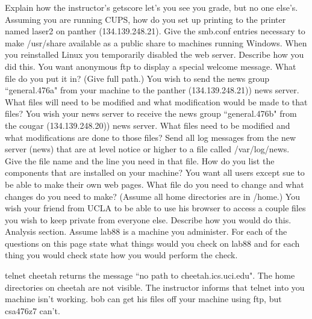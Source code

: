 Explain how the instructor's {\ltt{}getscore} let's you see you
grade, but no one else's.
\vskip 1.8in
\ques
Assuming you are running {\ltt{}CUPS}, how do you set up printing
to the printer named {\ltt{}laser2} on {\ltt{}panther}
({\ltt{}134.139.248.21}).
\vskip 1.2in
\ques
Give the {\ltt{}smb.conf} entries necessary to make
{\ltt{}/usr/share} available as a public share to
machines running Windows.
\vskip 1.5in
\vfill\eject
\ques
When you reinstalled Linux you temporarily disabled the web server.
Describe how you did this.
\vskip 0.9in
\ques
You want anonymous ftp to display a special welcome message.
What file do you put it in? (Give full path.)
\vskip 0.8in
\ques
You wish to send the news group ``general.476a" from your machine
to the {\ltt{}panther} ({\ltt{}134.139.248.21)}) news server.
What files will need to be modified
and what modification would be made to that files?
\vskip 2.6in
\ques
You wish your news server to receive the news group ``general.476b"
from the {\ltt{}cougar} ({\ltt{}134.139.248.20)}) news server.
What files need to be modified and what modifications are done to those files?
\vskip 2.2in
\vfill\eject
\ques
Send all log messages from the new server
({\ltt{}news}) that are at level {\ltt{}notice} or higher
to a file called {\ltt{}/var/log/news}.
Give the file name and the line you need in that file.
\vskip 0.8in
\ques
How do you list the components that are installed on your machine?
\vskip 1.2in
\ques
You want all users except {\ltt{}sue} to be able to make their
own web pages.
What file do you need to change and what changes do you need to make?
(Assume all home directories are in {\ltt{}/home}.)
\vskip 2.0in
\ques
You wish your friend from {\ltt{}UCLA} to be able to use his browser
to access a couple files you wish to keep private from everyone else.
Describe how you would do this.
\vskip 2.3in
\vfill\eject
Analysis section. Assume {\ltt{}lab88} is a machine you administer.
For each of the questions on this page
state what things would you check on {\ltt{}lab88}
and for each thing you would check state how you would perform the check.

\ques
{\ltt{}telnet cheetah} returns the message ``no path to
{\ltt{}cheetah.ics.uci.edu}".
\vfill
\ques
The home directories on {\ltt{}cheetah} are not visible.
\vfill
\ques
The instructor informs that {\ltt{}telnet} into you machine isn't working.
\vfill
\ques
{\ltt{}bob} can get his files off your machine using ftp,
but {\ltt{}csa476z7} can't.
\bye
